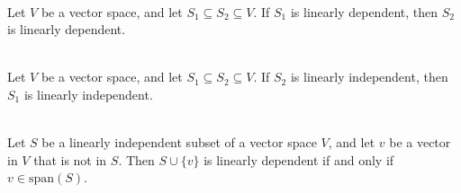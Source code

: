 \begin{theorem}
	\hfill\\
	Let $V$ be a vector space, and let $S_1 \subseteq S_2 \subseteq V$. If $S_1$ is linearly dependent, then $S_2$ is linearly dependent.
\end{theorem}

\begin{corollary}
	\hfill\\
	Let $V$ be a vector space, and let $S_1 \subseteq S_2 \subseteq V$. If $S_2$ is linearly independent, then $S_1$ is linearly independent.
\end{corollary}

\begin{theorem}
	\hfill\\
	Let $S$ be a linearly independent subset of a vector space $V$, and let $v$ be a vector in $V$ that is not in $S$. Then $S \cup \{v\}$ is linearly dependent if and only if $v \in \text{span}(S)$.
\end{theorem}